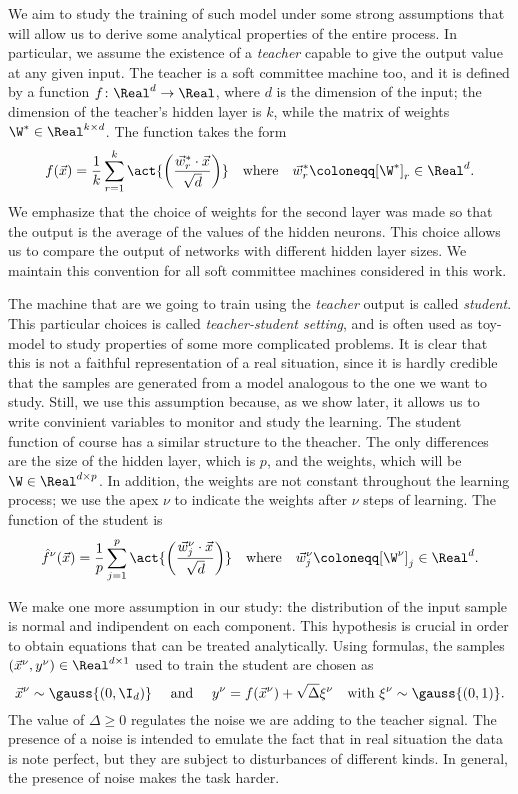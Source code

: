 We aim to study the training of such model under some strong assumptions that will
allow us to derive some analytical properties of the entire process.
In particular, we assume the existence of a \emph{teacher} capable to give the output
value at any given input. The teacher is a soft committee machine too, and it is defined 
by a function \(f\colon \Real^d\to\Real\), where \(d\) is the dimension
of the input; the dimension of the teacher's hidden layer is \(k\),
while the matrix of weights \(\W^* \in \Real^{k\times d}\).
The function takes the form
\[
  f{(\vec{x})} = \frac{1}{k}\sum_{r=1}^{k} \act{\left(\frac{\vec{w}^*_r \cdot \vec{x}}{\sqrt{d}}\right)}
  \quad\text{where}\quad \vec{w}^*_r \coloneqq [\W^*]_r \in \Real^d. 
\]
We emphasize that the choice of weights for the second layer was made so that
the output is the average of the values of the hidden neurons. This choice allows
us to compare the output of networks with different hidden layer sizes.
We maintain this convention for all soft committee machines considered in this work.

The machine that are we going to train using the \emph{teacher} output is called \emph{student}.
This particular choices is called \emph{teacher-student setting}, and is often used
as toy-model to study properties of some more complicated problems. It is clear that 
this is not a faithful representation of a real situation, since it is hardly credible 
that the samples are generated from a model analogous to the one we want to study. Still,
we use this assumption because, as we show later, it allows us to write convinient
variables to monitor and study the learning.
The student function of course has a similar structure to the theacher.
The only differences are the size of the hidden layer, which is \(p\),
and the weights, which will be  \(\W \in \Real^{d\times p}\). In addition, the weights are not constant
throughout the learning process; we use the apex \(\nu\) to indicate the weights after \(\nu\) steps of learning.
The function of the student is
\[
  \hat{f}^\nu{(\vec{x})} = \frac{1}{p}\sum_{j=1}^{p} \act{\left(\frac{\vec{w}^\nu_j \cdot \vec{x}}{\sqrt{d}}\right)}
  \quad\text{where}\quad \vec{w}^\nu_j \coloneqq [\W^\nu]_j \in \Real^d. 
\]

We make one more assumption in our study: the distribution of the input sample is
normal and indipendent on each component. This hypothesis is crucial in order to
obtain equations that can be treated analytically.
Using formulas, the samples \(\left(\vec{x}^\nu, y^\nu\right) \in \Real^{d\times1}\) 
used to train the student are chosen as
\[
  \vec{x}^\nu \sim \gauss{(0,\I_d)} \quad\text{ and }\quad 
  y^\nu = f{(\vec{x}^\nu) + \sqrt{\Delta}\xi^\nu}\quad\text{with } \xi^\nu \sim \gauss{(0,1)}.
\]
The value of \(\Delta\ge0\) regulates the noise we are adding to the teacher signal.
The presence of a noise is intended to emulate the fact that in real situation the 
data is note perfect, but they are subject to disturbances of different kinds.
In general, the presence of noise makes the task harder.

